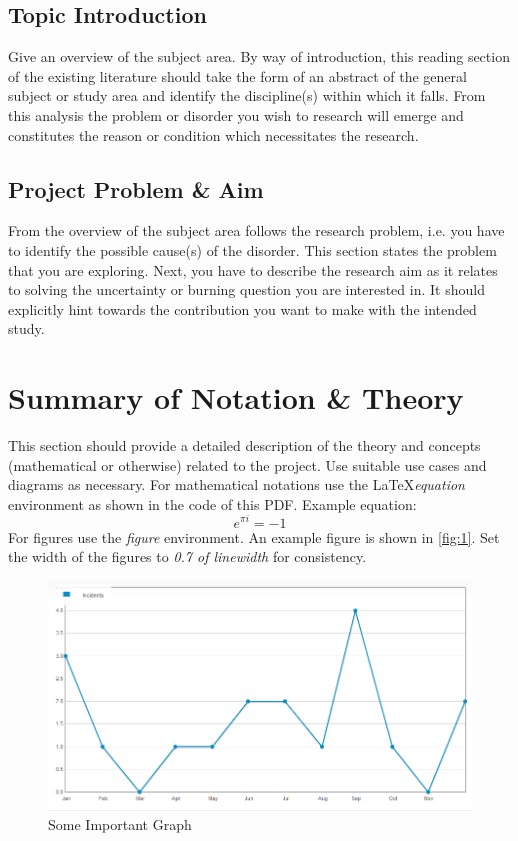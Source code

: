 \documentclass[hidelinks,14pt]{extarticle}
\begin{document}
\subsection{Topic Introduction}
\label{sec:1:1}
Give an overview of the subject area. By way of introduction, this reading section of the existing literature should take the form of an abstract of the general subject or study area and identify the discipline(s) within which it falls. From this analysis the problem or disorder you wish to research will emerge and constitutes the reason or condition which necessitates the research.

\subsection{Project Problem \& Aim}
\label{sec:1:2}
From the overview of the subject area follows the research problem, i.e. you have to identify the possible cause(s) of the disorder. This section states the problem that you are exploring. Next, you have to describe the research aim as it relates to solving the uncertainty or burning question you are interested in. It should explicitly hint towards the contribution you want to make with the intended study.

\section{Summary of Notation \& Theory}
\label{sec:2}
This section should provide a detailed description of the theory and concepts (mathematical or otherwise) related to the project. Use suitable use cases and diagrams as necessary.
For mathematical notations use the \LaTeX  \emph{equation} environment as shown in the code of this PDF.
Example equation:
\begin{equation}
\label{eq:1}
e^{\pi i} = -1
\end{equation}
For figures use the \emph{figure} environment. An example figure is shown in \autoref{fig:1}. Set the width of the figures to \emph{0.7 of linewidth} for consistency.
\begin{figure}[htbp]
\centerline{\includegraphics[width=0.7\linewidth]{fig/graph.png}}
\caption{Some Important Graph}
\label{fig:1}
\end{figure}
\end{document}
